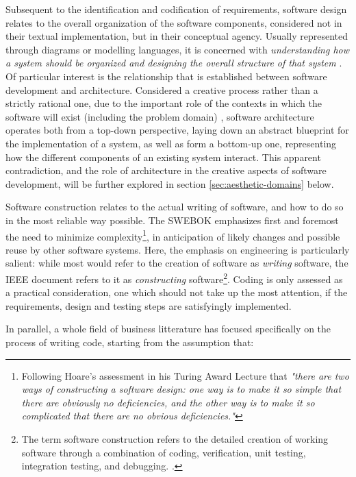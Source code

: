 Subsequent to the identification and codification of requirements, software design relates to the overall organization of the software components, considered not in their textual implementation, but in their conceptual agency. Usually represented through diagrams or modelling languages, it is concerned with \emph{understanding how a system should be organized and designing the overall structure of that system} \citep{sommerville_software_2010}. Of particular interest is the relationship that is established between software development and architecture. Considered a creative process rather than a strictly rational one, due to the important role of the contexts in which the software will exist (including the problem domain) \citep{sommerville_software_2010}, software architecture operates both from a top-down perspective, laying down an abstract blueprint for the implementation of a system, as well as form a bottom-up one, representing how the different components of an existing system interact. This apparent contradiction, and the role of architecture in the creative aspects of software development, will be further explored in section \ref{sec:aesthetic-domains} below.

Software construction relates to the actual writing of software, and how to do so in the most reliable way possible. The SWEBOK emphasizes first and foremost the need to minimize complexity\footnote{Following Hoare's assessment in his Turing Award Lecture that \emph{"there are two ways of constructing a software design: one way is to make it so simple that there are obviously no deficiencies, and the other way is to make it so complicated that there are no obvious deficiencies."}}, in anticipation of likely changes and possible reuse by other software systems. Here, the emphasis on engineering is particularly salient: while most would refer to the creation of software as \emph{writing} software, the IEEE document refers to it as \emph{constructing} software\footnote{The term software construction refers to the detailed creation of working software through a combination of coding, verification, unit testing, integration testing, and debugging. \citep{bourque_swebok_2014}.}. Coding is only assessed as a practical consideration, one which should not take up the most attention, if the requirements, design and testing steps are satisfyingly implemented.

In parallel, a whole field of business litterature \citep{martin_clean_2008,hendrickson_software_2002,fowler_refactoring_1999,mcconnell_code_2004} has focused specifically on the process of writing code, starting from the assumption that:

